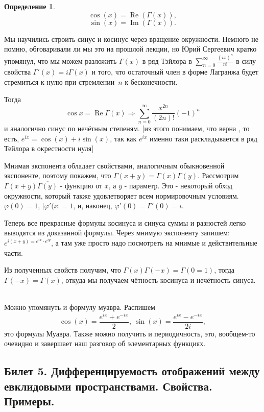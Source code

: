 \documentclass[a4paper]{article}
\theoremstyle{indented}
\theoremstyle{definition}
\newtheorem{defn}{Определение}
\theoremstyle{remark}
\DeclareMathOperator{\Imf}{Im}
\DeclareMathOperator{\Real}{Re}
\begin{document}
\begin{defn}
    \[
        \cos(x)=\Real(\Gamma(x)), 
    \]
    \[
        \sin(x)=\Imf(\Gamma(x)).
    \]
\end{defn}

Мы научились строить синус и косинус через вращение окружности. Немного не помню, обговаривали ли мы это на прошлой лекции, но Юрий Сергеевич кратко упомянул, что мы можем разложить $\Gamma(x)$ в ряд Тэйлора в $\sum_{n=0}^\infty\frac{(ix)^n}{n!}$ в силу свойства $\Gamma'(x)=i\Gamma(x)$ и того, что остаточный член в форме Лагранжа будет стремиться к нулю при стремлении $n$ к бесконечности. \ 

Тогда 
\[
    \cos x = \Real \Gamma(x) \Rightarrow \sum_{n=0}^\infty\frac{x^{2n}}{(2n)!}(-1)^n
\]
и аналогично синус по нечётным степеням. [из этого понимаем, что верна , то есть, $e^{ix} = \cos(x)+ i \sin(x)$, так как $e^{ix}$ именно таки раскладывается в ряд Тейлора в окрестности нуля] \ 

Мнимая экспонента обладает свойствами, аналогичным обыкновенной экспоненте, поэтому покажем, что $\Gamma(x+y)=\Gamma(x)\Gamma(y)$. Рассмотрим $\Gamma(x+y)\overline{\Gamma(y)}$ - функцию от $x$, а $y$ - параметр. Это - некоторый обход окружности, который также удовлетворяет всем нормировочным условиям. $\varphi(0)=1$, $|\varphi'(x|=1$, и, наконец, $\varphi'(0)=\Gamma'(0)= i$. \ 

Теперь все прекрасные формулы косинуса и синуса суммы и разностей легко выводятся из доказанной формулы. Через мнимую экспоненту запишем: $e^{i(x+y)=e^{ix}\cdot e^{iy}}$, а там уже просто надо посмотреть на мнимые и действительные части. \ 

Из полученных свойств получим, что $\Gamma(x)\Gamma(-x)=\Gamma(0=1)$, тогда $\Gamma(-x)=\overline{\Gamma(x)}$, откуда мы получаем чётность косинуса и нечётность синуса. \ 

Можно упомянуть и формулу муавра. Распишем 
\[
    \cos(x)=\frac{e^{ix}+e^{-ix}}{2}, \: \sin(x)=\frac{e^{ix}-e^{-ix}}{2i}, 
\]
это формулы Муавра. Также можно получить и периодичность, это, вообщем-то очевидно и завершает наш разговор об элементарных функциях. \\


\subsection{Билет 5. Дифференцируемость отображений между евклидовыми пространствами. Свойства. Примеры.}
\end{document}
